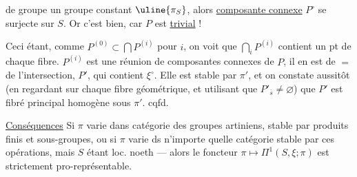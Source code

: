 de groupe un groupe constant $\uline{\pi_S}$, alors  \uline{composante connexe} $P^\circ$ se surjecte sur $S$. Or c'est bien, car $P$ est \uline{trivial} !

Ceci étant, comme $P^{(0)}\subset\bigcap P^{(i)}$ pour  $i$, on voit que $\bigcap_i P^{(i)}$ contient un pt de chaque fibre.      $P^{(i)}$ est une réunion de composantes connexes de $P$, il en est de $=$ de l'intersection,  $P'$, qui contient $\xi^\circ$. Elle est stable par $\pi'$, et on constate aussitôt (en regardant sur chaque fibre géométrique, et utilisant que $P'_{\bar s}\ne\varnothing$) que $P'$ est fibré principal homogène sous $\pi'$.
cqfd.

\uline{Conséquences} Si $\pi$ varie dans catégorie des groupes artiniens,  stable par produits finis et sous-groupes, ou si $\pi$ varie ds n'importe quelle catégorie stable par ces opérations, mais $S$ étant loc. noeth --- alors le foncteur $\pi\mapsto\Pi^1(S,\xi;\pi)$ est strictement pro-représentable.

